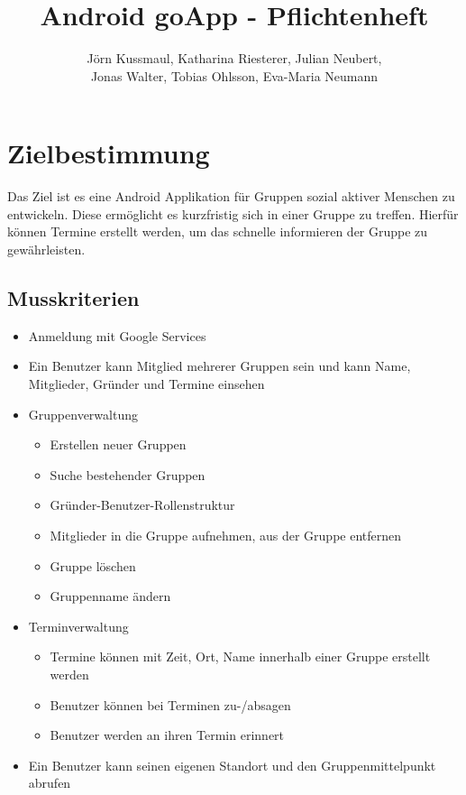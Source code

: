 \documentclass{scrartcl}
\title{Android goApp - Pflichtenheft}
\author{Jörn Kussmaul, Katharina Riesterer, Julian Neubert,\\ Jonas Walter, Tobias Ohlsson, Eva-Maria Neumann}
\begin{document}
		
	

	\maketitle
	\newpage
	
	\tableofcontents
	\newpage
	\section{Zielbestimmung}
	Das Ziel ist es eine Android Applikation für Gruppen sozial aktiver Menschen zu entwickeln. Diese ermöglicht es kurzfristig sich in einer Gruppe zu treffen. Hierfür können Termine erstellt werden, um das schnelle informieren der Gruppe zu gewährleisten.
	\subsection{Musskriterien}
	\begin{itemize}
		\item Anmeldung mit Google Services
		\item Ein Benutzer kann \gls{Mitglied} mehrerer Gruppen sein und kann Name, Mitglieder, Gründer und Termine einsehen
		\item Gruppenverwaltung
		\begin{itemize}
			\item Erstellen neuer Gruppen
			\item Suche bestehender Gruppen
			\item Gründer-Benutzer-Rollenstruktur
			\item Mitglieder in die Gruppe aufnehmen, aus der Gruppe entfernen
			\item Gruppe löschen
			\item Gruppenname ändern
		\end{itemize}
		\item Terminverwaltung
		\begin{itemize}
			\item Termine können mit Zeit, Ort, Name innerhalb einer Gruppe erstellt werden
			\item Benutzer können bei Terminen zu-/absagen
			\item Benutzer werden an ihren Termin erinnert
		\end{itemize}
		\item Ein Benutzer kann seinen eigenen Standort und den Gruppenmittelpunkt abrufen
	\end{itemize}
\end{document}
